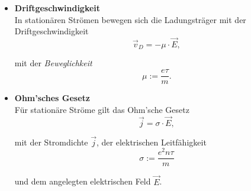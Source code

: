 \documentclass{article}
\begin{document}
	
	\begin{itemize}
		\item \textbf{Driftgeschwindigkeit}\\
		In stationären Strömen bewegen sich die Ladungsträger mit der Driftgeschwindigkeit
			\begin{equation}
				\vec{v}_D = -\mu \cdot \vec{E},
			\end{equation}
		
		mit der \textit{Beweglichkeit} 
			\begin{equation}
				\mu := \frac{e\tau}{m}.
			\end{equation}	
		
		
		\item \textbf{Ohm'sches Gesetz}\\
		Für stationäre Ströme gilt das Ohm'sche Gesetz
			\begin{equation}
				\vec{j} = \sigma \cdot \vec{E},
			\end{equation}
		
		mit der Stromdichte $\vec{j}$, der elektrischen Leitfähigkeit
			\begin{equation}
				\sigma := \frac{e^2 n \tau}{m}
			\end{equation}
		
		und dem angelegten elektrischen Feld $\vec{E}$.
	\end{itemize}


\newpage
\end{document}
